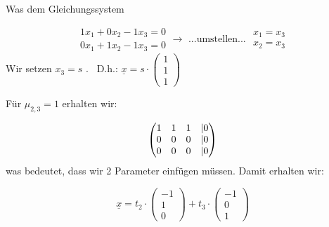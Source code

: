 \begin{uebsp}
\begin{Answer}

{
Was dem Gleichungssystem }



\begin{equation*}
\begin{matrix}1x_{1}+0x_{2}-1x_{3}=0\\0x_{1}+1x_{2}-1x_{3}=0\end{matrix}\rightarrow
\text{  ...umstellen...  
}\begin{matrix}x_{1}=x_{3}\\x_{2}=x_{3}\end{matrix}
\end{equation*}
{
Wir setzen $x_{3}=s$ . \ D.h.:  $\underline{{x}}=s\cdot
\left(\begin{matrix}1\\1\\1\end{matrix}\right)$ }





{
F\"ur  $\mu _{2,3}=1$ erhalten wir:}



\begin{equation*}
\left(\begin{matrix}1&1&1&\text{{\textbar}}0\\0&0&0&\text{{\textbar}}0\\0&0&0&\text{{\textbar}}0\end{matrix}\right)
\end{equation*}
{
was bedeutet, dass wir 2 Parameter einf\"ugen m\"ussen. Damit erhalten
wir:}



\begin{equation*}
\underline{{x}}=t_{2}\cdot
\left(\begin{matrix}-1\\1\\0\end{matrix}\right)+t_{3}\cdot
\left(\begin{matrix}-1\\0\\1\end{matrix}\right)
\end{equation*}





\end{Answer}
\end{uebsp}
